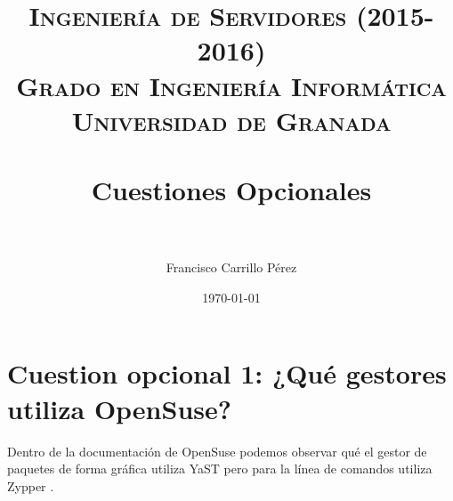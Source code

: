 

\title{	
\normalfont \normalsize 
\textsc{{\bf Ingeniería de Servidores (2015-2016)} \\ Grado en Ingeniería Informática \\ Universidad de Granada} \\ [25pt] %
\horrule{0.5pt} \\[0.4cm] %
\huge Cuestiones Opcionales \\ %
\horrule{2pt} \\[0.5cm] %
}

\author{Francisco Carrillo Pérez} %

\date{\normalsize\today} %




\maketitle %

\newpage %

\tableofcontents %

\listoffigures

\listoftables

\newpage


\section{Cuestion opcional 1: ¿Qué gestores utiliza OpenSuse?}

Dentro de la documentación de OpenSuse \cite{gestorpaquetesopen} podemos observar qué el gestor de paquetes de forma gráfica utiliza YaST \cite{yast} pero para la línea de comandos utiliza Zypper \cite{zipper}.

